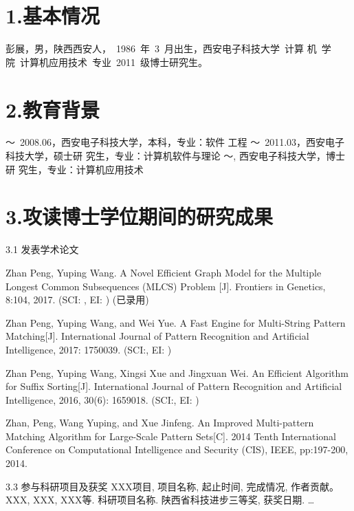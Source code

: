 
\begin{resume}

\section*{1.\hspace{0.75em}基本情况}
彭展，男，陕西西安人，~1986~年~3~月出生，西安电子科技大学~计算
机~学院~计算机应用技术~专业~2011~级博士研究生。
\section*{2.\hspace{0.75em}教育背景}
\begin{resumelist*}
  ～~2008.06，西安电子科技大学，本科，专业：软件
  工程
  ～~2011.03，西安电子科技大学，硕士研
  究生，专业：计算机软件与理论
  ～\hspace{3.5em}, 西安电子科技大学，博士研
  究生，专业：计算机应用技术
\end{resumelist*}

\section*{3.\hspace{0.75em}攻读博士学位期间的研究成果}
\begin{resumelist}{\hspace{-0.25em}3.1\hspace{0.5em} 发表学术论文}

  \resumelistitem Zhan Peng, Yuping Wang. A Novel Efficient Graph
  Model for the Multiple Longest Common Subsequences (MLCS) Problem
  [J]. Frontiers in Genetics, 8:104, 2017. (SCI: , EI: ) (已录用)

  \resumelistitem Zhan Peng, Yuping Wang, and Wei Yue. A Fast Engine
  for Multi-String Pattern Matching[J]. International Journal of Pattern
  Recognition and Artificial Intelligence, 2017: 1750039. (SCI:, EI: )

  \resumelistitem Zhan Peng, Yuping Wang, Xingsi Xue and Jingxuan
  Wei. An Efficient Algorithm for Suffix Sorting[J]. International
  Journal of Pattern Recognition and Artificial Intelligence, 2016,
  30(6): 1659018. (SCI:, EI: )

  \resumelistitem Zhan, Peng, Wang Yuping, and Xue Jinfeng. An
  Improved Multi-pattern Matching Algorithm for Large-Scale Pattern
  Sets[C]. 2014 Tenth International Conference on Computational
  Intelligence and Security (CIS), IEEE, pp:197-200, 2014.

  \resumelistiem 
\end{resumelist}

\begin{resumelist}{\hspace{-0.25em}3.3\hspace{0.5em} 参与科研项目及获奖}
\resumelistitem XXX项目, 项目名称, 起止时间, 完成情况, 作者贡献。
\resumelistitem XXX, XXX, XXX等. 科研项目名称. 陕西省科技进步三等奖, 获奖日期.
\resumelistitem \ldots
\end{resumelist}
\end{resume}
